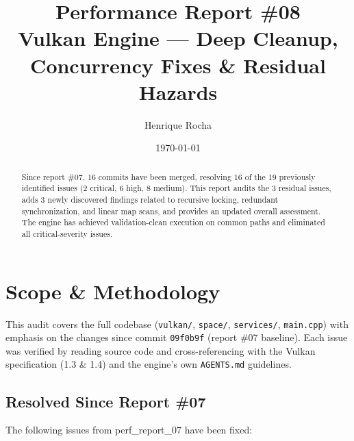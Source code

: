 \documentclass[a4paper,12pt]{article}
\title{\textbf{Performance Report \#08}\\[4pt]
\large Vulkan Engine — Deep Cleanup, Concurrency Fixes \& Residual Hazards}
\author{Henrique Rocha}
\date{\today}
\begin{document}
\maketitle

\begin{abstract}
Since report \#07, 16 commits have been merged, resolving 16 of the 19 previously
identified issues (2 critical, 6 high, 8 medium). This report audits the 3 residual
issues, adds 3 newly discovered findings related to recursive locking, redundant
synchronization, and linear map scans, and provides an updated overall assessment.
The engine has achieved validation-clean execution on common paths and eliminated
all critical-severity issues.
\end{abstract}

\tableofcontents
\newpage

\section{Scope \& Methodology}

This audit covers the full codebase (\texttt{vulkan/}, \texttt{space/},
\texttt{services/}, \texttt{main.cpp}) with emphasis on the changes since
commit \texttt{09f0b9f} (report \#07 baseline). Each issue was verified by
reading source code and cross-referencing with the Vulkan specification (1.3
\& 1.4) and the engine's own \texttt{AGENTS.md} guidelines.

\subsection*{Resolved Since Report \#07}

The following issues from perf\_report\_07 have been fixed:
\end{document}
